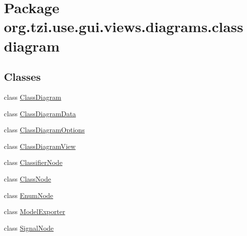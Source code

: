 \hypertarget{namespaceorg_1_1tzi_1_1use_1_1gui_1_1views_1_1diagrams_1_1classdiagram}{\section{Package org.\-tzi.\-use.\-gui.\-views.\-diagrams.\-classdiagram}
\label{namespaceorg_1_1tzi_1_1use_1_1gui_1_1views_1_1diagrams_1_1classdiagram}
}
\subsection*{Classes}
\begin{DoxyCompactItemize}
\item 
class \hyperlink{classorg_1_1tzi_1_1use_1_1gui_1_1views_1_1diagrams_1_1classdiagram_1_1_class_diagram}{Class\-Diagram}
\item 
class \hyperlink{classorg_1_1tzi_1_1use_1_1gui_1_1views_1_1diagrams_1_1classdiagram_1_1_class_diagram_data}{Class\-Diagram\-Data}
\item 
class \hyperlink{classorg_1_1tzi_1_1use_1_1gui_1_1views_1_1diagrams_1_1classdiagram_1_1_class_diagram_options}{Class\-Diagram\-Options}
\item 
class \hyperlink{classorg_1_1tzi_1_1use_1_1gui_1_1views_1_1diagrams_1_1classdiagram_1_1_class_diagram_view}{Class\-Diagram\-View}
\item 
class \hyperlink{classorg_1_1tzi_1_1use_1_1gui_1_1views_1_1diagrams_1_1classdiagram_1_1_classifier_node}{Classifier\-Node}
\item 
class \hyperlink{classorg_1_1tzi_1_1use_1_1gui_1_1views_1_1diagrams_1_1classdiagram_1_1_class_node}{Class\-Node}
\item 
class \hyperlink{classorg_1_1tzi_1_1use_1_1gui_1_1views_1_1diagrams_1_1classdiagram_1_1_enum_node}{Enum\-Node}
\item 
class \hyperlink{classorg_1_1tzi_1_1use_1_1gui_1_1views_1_1diagrams_1_1classdiagram_1_1_model_exporter}{Model\-Exporter}
\item 
class \hyperlink{classorg_1_1tzi_1_1use_1_1gui_1_1views_1_1diagrams_1_1classdiagram_1_1_signal_node}{Signal\-Node}
\end{DoxyCompactItemize}
